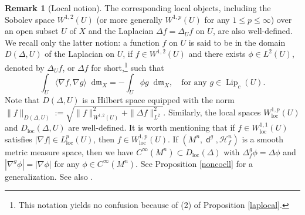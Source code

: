 \documentclass[11pt,reqno]{amsart}
\theoremstyle{definition}
\newtheorem{remark}[theorem]{Remark}
\numberwithin{equation}{section}
\newcommand{\di}{\mathop{}\!\mathrm{d}}
\newcommand{\meas}{\mathfrak{m}}
\DeclareMathOperator{\dist}{\mathsf{d}}
\DeclareMathOperator{\Lip}{Lip}
\DeclareMathOperator{\loc}{loc}
\newcommand{\haus}{\mathscr{H}}
\begin{document}
\begin{remark}[Local notion]\label{rem:localrem}
The corresponding local objects, including the Sobolev space $W^{1,2}(U)$ (or more generally $W^{1,p}(U)$ for any $1 \le p \le \infty$) over an open subset $U$ of $X$ and the Laplacian $\Delta f=\Delta_Uf$ on $U$, are also well-defined. We recall only the latter notion: a function $f$ on $U$ is said to be in the domain $D(\Delta, U)$ of the Laplacian on $U$, if $f \in W^{1,2}(U)$ and there exists $\phi \in L^2(U)$, denoted by $\Delta_U f$, or $\Delta f$ for short,\footnote{This notation yields no confusion because of (2) of Proposition \ref{laplocal}.} such that 
\begin{equation}
    \int_U\langle \nabla f, \nabla g\rangle \di \meas_X=-\int_U\phi g\di \meas_X,\quad \text{for any $g \in \Lip _c(U)$.}
\end{equation}
Note that $D(\Delta, U)$ is a Hilbert space equipped with the norm 
$
    \|f\|_{D(\Delta, U)}:=\sqrt{\|f\|_{W^{1,2}(U)}^2+\|\Delta f\|_{L^2}^2}.
$ 
Similarly, the local spaces $W^{1, p}_{\loc}(U)$ and $D_{\loc}(\Delta, U)$ are well-defined. It is worth mentioning that if $f \in W^{1,1}_{\loc}(U)$ satisfies $|\nabla f| \in L^p_{\loc}(U)$, then $f \in W^{1,p}_{\loc}(U)$. If $(M^n, \dist^g, \haus^n_f)$ is a smooth metric measure space, then we have $C^{\infty}(M^n)\subset D_{\loc}(\Delta)$ with $\Delta^g_f\phi=\Delta \phi$ and $|\nabla^g \phi|=|\nabla \phi|$ for any $\phi \in C^{\infty}(M^n)$. See Proposition \ref{noncocll} for a generalization.
See also \cite{AmbrosioHonda2, BjornBjorn, HK, HKPST}.
\end{remark}
\end{document}
